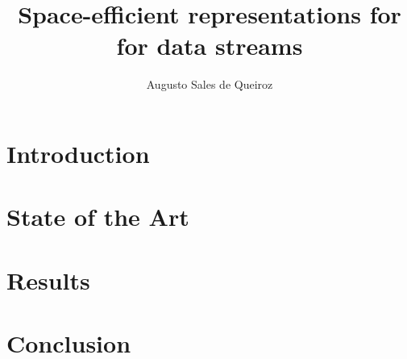 \documentclass[bsc,en]{ufpethesis}
\institute{Centro de Informatica}
\author{Augusto Sales de Queiroz}
\title{Space-efficient representations for \dBG for data streams}
\begin{document}
    \linenumbers
    \frontmatter
    \frontpage
    \presentationpage

    \mainmatter
    \chapter{Introduction}
    \chapter{State of the Art}
    
    \chapter{Results}
    \chapter{Conclusion}

    \backmatter
    
    
\end{document}
